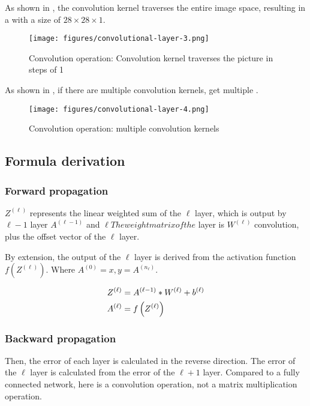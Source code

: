 \begin{content}
\begin{content}
As shown in , the convolution kernel traverses the entire image space, resulting in a  with a size of $28 \times 28 \times 1$.

\begin{figure}[H]
  \centering
  \texttt{[image: figures/convolutional-layer-3.png]}
  \caption{Convolution operation: Convolution kernel traverses the picture in steps of 1}
  \label{fig:mnist-conv-ndot}
\end{figure}

As shown in , if there are multiple convolution kernels, get multiple .

\begin{figure}[H]
  \centering
  \texttt{[image: figures/convolutional-layer-4.png]}
  \caption{Convolution operation: multiple convolution kernels}
  \label{fig:mnist-conv-multi-filters}
\end{figure}


\subsection{Formula derivation}

\subsubsection{Forward propagation}
$Z^{(\ell )}$ represents the linear weighted sum of the $\ell$ layer, which is output by $\ell - 1$ layer $A^{(\ell - 1)}$ and $\ell The weight matrix of the $ layer is $W^{(\ell )}$ convolution, plus the offset vector of the $\ell$ layer.

By extension, the output of the $\ell$ layer is derived from the activation function $f({Z^{(\ell )}})$. Where ${A^{(0)}} = x, y = {A^{({n_\ell })}}$.

\[\begin{gathered}
  {Z^{(\ell )}} = {A^{(\ell  - 1)}} * {W^{(\ell )}} + {b^{(\ell )}} \hfill \\
  {A^{(\ell )}} = f\left( {{Z^{(\ell )}}} \right) \hfill \\ 
\end{gathered} \]


\subsubsection{Backward propagation}
Then, the error of each layer is calculated in the reverse direction. The error of the $\ell$ layer is calculated from the error of the $\ell + 1$ layer. Compared to a fully connected network, here is a convolution operation, not a matrix multiplication operation.


\end{content}
\end{content}
